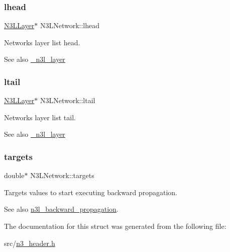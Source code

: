 \subsubsection{\texorpdfstring{lhead}{lhead}}
{\footnotesize\ttfamily \hyperlink{n3__header_8h_a9ee3a7104816bdb6222148cfe9ca8ad9}{N3\+L\+Layer}$\ast$ N3\+L\+Network\+::lhead}

Network\textquotesingle{}s layer list head. \begin{DoxySeeAlso}{See also}
\hyperlink{struct__n3l__layer}{\+\_\+n3l\+\_\+layer} 
\end{DoxySeeAlso}
\mbox{\label{structN3LNetwork_a758fd06b3dda29e064ccd4bc4d27e1c3}} 
\subsubsection{\texorpdfstring{ltail}{ltail}}
{\footnotesize\ttfamily \hyperlink{n3__header_8h_a9ee3a7104816bdb6222148cfe9ca8ad9}{N3\+L\+Layer}$\ast$ N3\+L\+Network\+::ltail}

Network\textquotesingle{}s layer list tail. \begin{DoxySeeAlso}{See also}
\hyperlink{struct__n3l__layer}{\+\_\+n3l\+\_\+layer} 
\end{DoxySeeAlso}
\mbox{\label{structN3LNetwork_aba0f6767a66173743840b7c9fa919daf}} 
\subsubsection{\texorpdfstring{targets}{targets}}
{\footnotesize\ttfamily double$\ast$ N3\+L\+Network\+::targets}

Targets values to start executing backward propagation. \begin{DoxySeeAlso}{See also}
\hyperlink{n3__backward_8c_a871c936d33bfb280aa548e2dfd5ff32c}{n3l\+\_\+backward\+\_\+propagation}. 
\end{DoxySeeAlso}


The documentation for this struct was generated from the following file\+:\begin{DoxyCompactItemize}
\item 
src/\hyperlink{n3__header_8h}{n3\+\_\+header.\+h}\end{DoxyCompactItemize}
